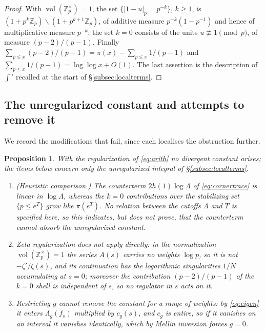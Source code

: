 \documentclass[11pt]{amsart}
\newtheorem{proposition}[theorem]{Proposition}
\theoremstyle{definition}
\theoremstyle{remark}
\newcommand{\Z}{\mathbb Z}
\begin{document}
\begin{proof}
With $\operatorname{vol}(\Z_p^\times)=1$, the set $\{|1-u|_p=p^{-k}\}$,
$k\ge1$, is $(1+p^k\Z_p)\smallsetminus(1+p^{k+1}\Z_p)$, of additive measure
$p^{-k}(1-p^{-1})$ and hence of multiplicative measure $p^{-k}$; the set
$k=0$ consists of the units $u\not\equiv1\pmod p$, of measure
$(p-2)/(p-1)$.  Finally $\sum_{p\le x}(p-2)/(p-1)=\pi(x)-\sum_{p\le
x}1/(p-1)$ and $\sum_{p\le x}1/(p-1)=\log\log x+O(1)$.  The last assertion
is the description of $\int'$ recalled at the start of
\S\ref{subsec:localterms}.
\end{proof}

\subsection{The unregularized constant and attempts to remove it}

We record the modifications that fail, since each localises the obstruction
further.

\begin{proposition}\label{prop:norepair}
With the regularization of \eqref{eq:arith} no divergent constant arises;
the items below concern only the unregularized integral of
\S\ref{subsec:localterms}.
\begin{enumerate}
\item \emph{(Heuristic comparison.)} The counterterm $2h(1)\log\Lambda$ of
\eqref{eq:cornertrace} is linear in $\log\Lambda$, whereas the $k=0$
contributions over the stabilizing set $\{p\le e^{T}\}$ grow like
$\pi(e^{T})$.  No relation between the cutoffs $\Lambda$ and $T$ is
specified here, so this indicates, but does not prove, that the
counterterm cannot absorb the unregularized constant.
\item Zeta regularization does not apply directly: in the normalization
$\operatorname{vol}(\Z_p^\times)=1$ the series $A(s)$ carries no weights
$\log p$, so it is not $-\zeta'/\zeta(s)$, and its continuation has the
logarithmic singularities $1/N$ accumulating at $s=0$; moreover the
contribution $(p-2)/(p-1)$ of the $k=0$ shell is independent of $s$, so no
regulator in $s$ acts on it.
\item Restricting $g$ cannot remove the constant for a range of weights:
by \eqref{eq:eigen} it enters $\Lambda_g(f_s)$ multiplied by $c_g(s)$, and
$c_g$ is entire, so if it vanishes on an interval it vanishes identically,
which by Mellin inversion forces $g=0$.
\end{enumerate}
\end{proposition}
\end{document}

